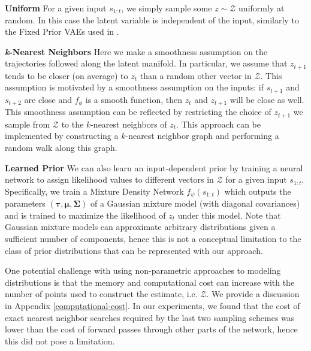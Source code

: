 \documentclass{article}
\begin{document}


\textbf{Uniform} \quad
For a given input $s_{1:t}$, we simply sample some $z \sim \mathcal{Z}$ uniformly at random. In this case the latent variable is independent of the input, similarly to the Fixed Prior VAEs used in \citep{Denton18}.

\textbf{\emph{k}-Nearest Neighbors} \quad
Here we make a smoothness assumption on the trajectories followed along the latent manifold.
In particular, we assume that $z_{t+1}$ tends to be closer (on average) to $z_t$ than a random other vector in $\mathcal{Z}$.
This assumption is motivated by a smoothness assumption on the inputs: if $s_{t+1}$ and $s_{t+2}$ are close and $f_\phi$ is a smooth function, then $z_t$ and $z_{t+1}$ will be close as well.
This smoothness assumption can be reflected by restricting the choice of $z_{t+1}$ we sample from $\mathcal{Z}$ to the $k$-nearest neighbors of $z_t$.
This approach can be implemented by constructing a $k$-nearest neighbor graph and performing a random walk along this graph.

\textbf{Learned Prior} \quad
We can also learn an input-dependent prior by training a neural network to assign likelihood values to different vectors in $\mathcal{Z}$ for a given input $s_{1:t}$.
Specifically, we train a Mixture Density Network \citep{mixture-density-networks} $f_\psi(s_{1:t})$ which outputs the parameters $(\bm{\tau}, \bm{\mu}, \bm{\Sigma})$ of a Gaussian mixture model (with diagonal covariances) and is trained to maximize the likelihood of $z_t$ under this model.
Note that Gaussian mixture models can approximate arbitrary distributions given a sufficient number of components, hence this is not a conceptual limitation to the class of prior distributions that can be represented with our approach.

One potential challenge with using non-parametric approaches to modeling distributions is that the memory and computational cost can increase with the number of points used to construct the estimate, i.e. $\mathcal{Z}$.
We provide a discussion in Appendix \ref{computational-cost}.
In our experiments, we found that the cost of exact nearest neighbor searches required by the last two sampling schemes was lower than the cost of forward passes through other parts of the network, hence this did not pose a limitation.
\end{document}
